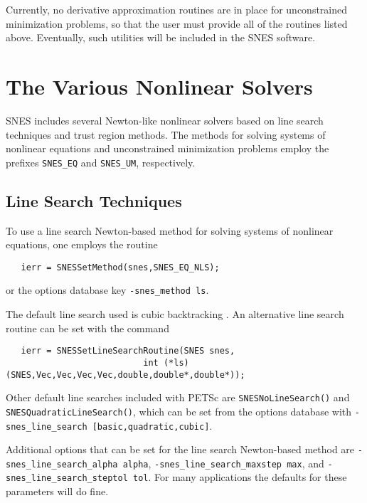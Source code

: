 Currently, no derivative approximation routines are in place for 
unconstrained minimization problems, so that the user must provide
all of the routines listed above.  Eventually, such utilities
will be included in the SNES software.

\section{The Various Nonlinear Solvers}

SNES includes several Newton-like nonlinear solvers based on line
search techniques and trust region methods.  The methods for solving
systems of nonlinear equations and unconstrained minimization problems
employ the prefixes {\tt SNES\_EQ} and {\tt SNES\_UM}, respectively.

\subsection{Line Search Techniques} 

To use a line search Newton-based method for solving systems of
nonlinear equations, one employs the 
routine 
\begin{verbatim}
   ierr = SNESSetMethod(snes,SNES_EQ_NLS);
\end{verbatim}
or the options database key {\tt -snes\_method ls}.  

The default line search used is cubic backtracking \cite{dennis:83}. 
An alternative line search routine can be set with the
command  
\begin{verbatim}
   ierr = SNESSetLineSearchRoutine(SNES snes,
                           int (*ls)(SNES,Vec,Vec,Vec,Vec,double,double*,double*));
\end{verbatim}
Other default line searches included with PETSc are 
{\tt  SNESNoLineSearch()} 
and {\tt SNESQuadraticLineSearch()}, 
which can be set from the options database with
{\tt -snes\_line\_search [basic,quadratic,cubic]}. 

Additional options that can be set for the line search Newton-based method are 
{\tt -snes\_line\_search\_alpha alpha}, 
{\tt -snes\_line\_search\_maxstep max}, and 
{\tt -snes\_line\_search\_steptol tol}. 
For many applications the defaults for these parameters will do fine. 


